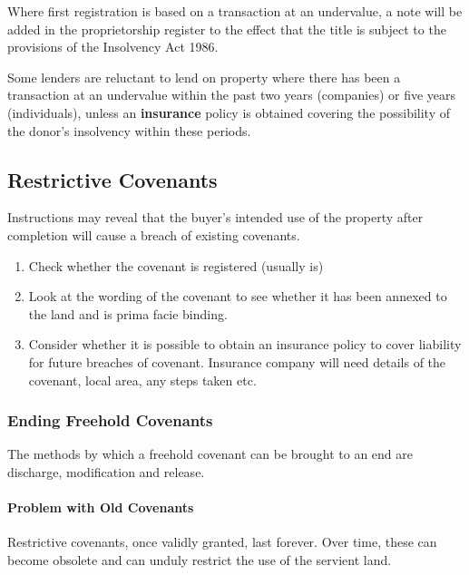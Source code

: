 \documentclass[
]{article}
\providecommand{\tightlist}{%
  \setlength{\itemsep}{0pt}\setlength{\parskip}{0pt}}
\begin{document}
Where first registration is based on a transaction at an undervalue, a
note will be added in the proprietorship register to the effect that the
title is subject to the provisions of the Insolvency Act 1986.

Some lenders are reluctant to lend on property where there has been a
transaction at an undervalue within the past two years (companies) or
five years (individuals), unless an \textbf{insurance} policy is
obtained covering the possibility of the donor's insolvency within these
periods.

\hypertarget{restrictive-covenants}{%
\subsection{Restrictive Covenants}\label{restrictive-covenants}}

Instructions may reveal that the buyer's intended use of the property
after completion will cause a breach of existing covenants.

\begin{enumerate}
\def\labelenumi{\arabic{enumi}.}
\tightlist
\item
  Check whether the covenant is registered (usually is)
\item
  Look at the wording of the covenant to see whether it has been annexed
  to the land and is prima facie binding.
\item
  Consider whether it is possible to obtain an insurance policy to cover
  liability for future breaches of covenant. Insurance company will need
  details of the covenant, local area, any steps taken etc.
\end{enumerate}

\hypertarget{ending-freehold-covenants}{%
\subsubsection{Ending Freehold
Covenants}\label{ending-freehold-covenants}}

The methods by which a freehold covenant can be brought to an end are
discharge, modification and release.

\hypertarget{problem-with-old-covenants}{%
\paragraph{Problem with Old
Covenants}\label{problem-with-old-covenants}}

Restrictive covenants, once validly granted, last forever. Over time,
these can become obsolete and can unduly restrict the use of the
servient land.
\end{document}
